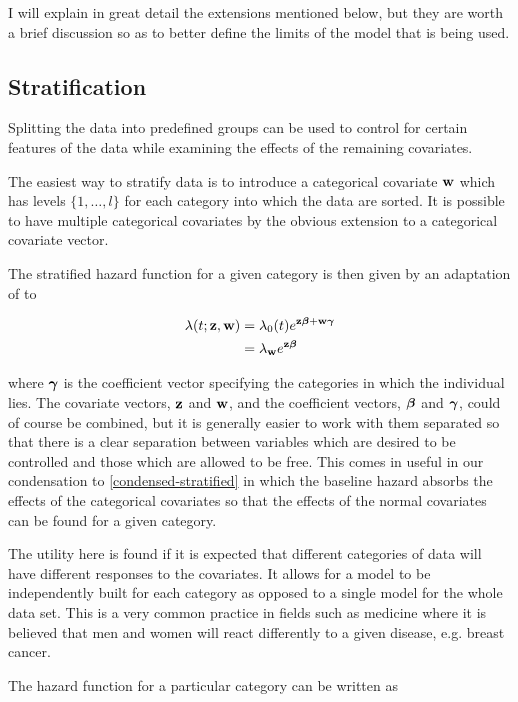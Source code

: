 I will explain in great detail the extensions mentioned below, but they are worth a brief discussion so as to better define the limits of the model that is being used.

\subsection{Stratification}\label{stratification}

Splitting the data into predefined groups can be used to control for certain features of the data while examining the effects of the remaining covariates. 

The easiest way to stratify data is to introduce a categorical covariate $\textbf{w}$ which has levels $\{1,\ldots,l\}$ for each category into which the data are sorted. It is possible to have multiple categorical covariates by the obvious extension to a categorical covariate vector.

The stratified hazard function for a given category is then given by an adaptation of  to

\begin{align}
    \lambda(t;\textbf{z},\textbf{w})&=\lambda_0(t)e^{\textbf{z}\boldsymbol{\beta} + \textbf{w}\boldsymbol{\gamma}}\\
    \label{condensed-stratified} &=\lambda_{\textbf{w}}e^{\textbf{z}\boldsymbol{\beta}}
\end{align}

where $\boldsymbol{\gamma}$ is the coefficient vector specifying the categories in which the individual lies. The covariate vectors, $\textbf{z}$ and $\textbf{w}$, and the coefficient vectors, $\boldsymbol{\beta}$ and $\boldsymbol{\gamma}$, could of course be combined, but it is generally easier to work with them separated so that there is a clear separation between variables which are desired to be controlled and those which are allowed to be free. This comes in useful in our condensation to \ref{condensed-stratified} in which the baseline hazard absorbs the effects of the categorical covariates so that the effects of the normal covariates can be found for a given category.

The utility here is found if it is expected that different categories of data will have different responses to the covariates. It allows for a model to be independently built for each category as opposed to a single model for the whole data set. This is a very common practice in fields such as medicine where it is believed that men and women will react differently to a given disease, e.g. breast cancer.

The hazard function for a particular category can be written as

